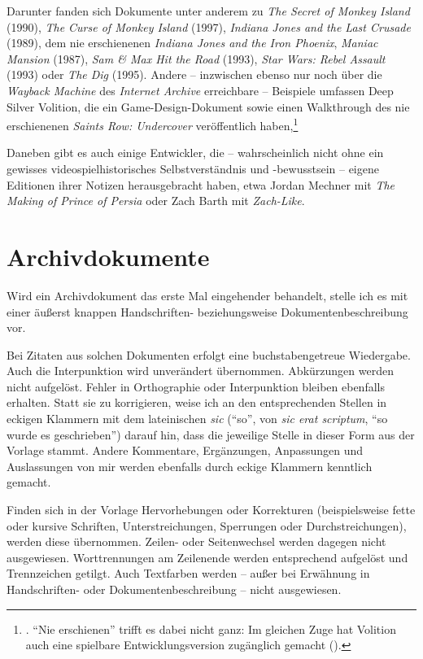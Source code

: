 \documentclass[a5paper,pagesize]{scrbook}
\begin{document}
Darunter fanden sich Dokumente unter anderem zu \textit{The Secret of Monkey Island} (1990), \textit{The Curse of Monkey Island} (1997), \textit{Indiana Jones and the Last Crusade} (1989), dem nie erschienenen \textit{Indiana Jones and the Iron Phoenix}, \textit{Maniac Mansion} (1987), \textit{Sam \& Max Hit the Road} (1993), \textit{Star Wars: Rebel Assault} (1993) oder \textit{The Dig} (1995).
Andere -- inzwischen ebenso nur noch über die \textit{Wayback Machine} des \textit{Internet Archive} erreichbare -- Beispiele umfassen Deep Silver Volition, die ein Game-Design-Dokument sowie einen Walkthrough des nie erschienenen \textit{Saints Row: Undercover} veröffentlich haben,\footnote{\autocite[Vgl.][]{volition_thursday_2016}. \enquote{Nie erschienen} trifft es dabei nicht ganz: Im gleichen Zuge hat Volition auch eine spielbare Entwicklungsversion zugänglich gemacht (\autocite[vgl.][]{frank_canceled_2016}).} 

Daneben gibt es auch einige Entwickler, die -- wahrscheinlich nicht ohne ein gewisses videospielhistorisches Selbstverständnis und -bewusstsein -- eigene Editionen ihrer Notizen herausgebracht haben, etwa Jordan Mechner mit \textit{The Making of Prince of Persia} oder Zach Barth mit \textit{Zach-Like}.


\section{Archivdokumente}\label{ch:quellen_archivdokumente}
Wird ein Archivdokument das erste Mal eingehender behandelt, stelle ich es mit einer äußerst knappen Handschriften- beziehungsweise Dokumentenbeschreibung vor.

Bei Zitaten aus solchen Dokumenten erfolgt eine buchstabengetreue Wiedergabe.
Auch die Interpunktion wird unverändert übernommen.
Abkürzungen werden nicht aufgelöst.
Fehler in Orthographie oder Interpunktion bleiben ebenfalls erhalten.
Statt sie zu korrigieren, weise ich an den entsprechenden Stellen in eckigen Klammern mit dem lateinischen \textit{sic} (\enquote{so}, von \textit{sic erat scriptum}, \enquote{so wurde es geschrieben}) darauf hin, dass die jeweilige Stelle in dieser Form aus der Vorlage stammt.
Andere Kommentare, Ergänzungen, Anpassungen und Auslassungen von mir werden ebenfalls durch eckige Klammern kenntlich gemacht.

Finden sich in der Vorlage Hervorhebungen oder Korrekturen (beispielsweise fette oder kursive Schriften, Unterstreichungen, Sperrungen oder Durchstreichungen), werden diese übernommen.
Zeilen- oder Seitenwechsel werden dagegen nicht ausgewiesen.
Worttrennungen am Zeilenende werden entsprechend aufgelöst und Trennzeichen getilgt.
Auch Textfarben werden -- außer bei Erwähnung in Handschriften- oder Dokumentenbeschreibung -- nicht ausgewiesen.
\end{document}
